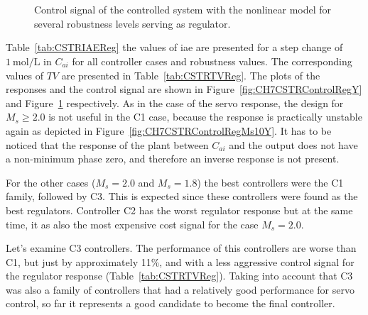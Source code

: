 %
%
\begin{figure}
	\centering
	\\
	\\
	\caption{Control signal of the controlled system with the nonlinear model for several robustness levels serving as regulator.}
	\label{fig:CH7CSTRControlRegU}
\end{figure}
%
Table~\ref{tab:CSTRIAEReg} the values of \gls{iae} are presented for a step change of $\SI{1}{\mole\per\liter}$ in $C_{ai}$ for all controller cases and robustness values. The corresponding values of $TV$ are presented in Table~\ref{tab:CSTRTVReg}. The plots of the responses and the control signal are shown in Figure~\ref{fig:CH7CSTRControlRegY} and Figure~\ref{fig:CH7CSTRControlRegU} respectively. As in the case of the servo response, the design for $M_s \geq 2.0$ is not useful in the C1 case, because the response is practically unstable again as depicted in Figure~\ref{fig:CH7CSTRControlRegMs10Y}. It has to be noticed that the response of the plant between $C_{ai}$ and the output does not have a non-minimum phase zero, and therefore an inverse response is not present.

For the other cases ($M_s = 2.0$ and $M_s = 1.8$) the best controllers were the C1 family, followed by C3. This is expected since these controllers were found as the best regulators. Controller C2 has the worst regulator response but at the same time, it as also the most expensive cost signal for the case $M_s = 2.0$.

Let's examine C3 controllers. The performance of this controllers are worse than C1, but just by approximately 11\%, and with a less aggressive control signal for the regulator response (Table~\ref{tab:CSTRTVReg}). Taking into account that C3 was also a family of controllers that had a relatively good performance for servo control, so far it represents a good candidate to become the final controller.

